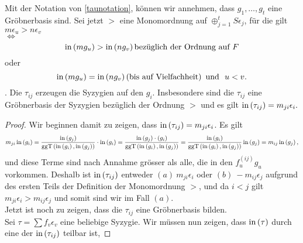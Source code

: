 \documentclass{article}
\begin{document}
	\begin{thm}[Schreyer \cite{Eis1}[15.10]
		Mit der Notation von \ref{taunotation}, 
		k\"onnen wir annehmen,
		dass
		\( g_1,\dots,g_t\)
		eine Gr\"obnerbasis sind.
		Sei jetzt 
		\( > \) 
		eine Monomordnung auf 
		\( \oplus_{j=1}^t S \epsilon_{j} \),
		f\"ur die gilt
		\( m \epsilon_{u} > n \epsilon_{v} \) \\
		\(\iff\)
		\[
			\operatorname{in}\left(  m g_{u} \right) > \operatorname{in}\left( n g_{v} \right) 
			\text{bez\"uglich der Ordnung auf } F 
		\]
		oder
		\[
			\operatorname{in}\left( m g_{u} \right) = \operatorname{in}\left( n g_{v} \right) 
			\left( \text{bis auf Vielfachheit} \right) \text{\ und \ } u < v.
		\].
		Die
		\( \tau_{ij} \) 
		erzeugen die Syzygien auf den
		\( g_{i} \).
		Insbesondere sind die
		\( \tau_{ij} \)
		eine Gr\"obnerbasis der Syzygien bez\"uglich der Ordnung
		\( > \)
		und es gilt
		\( \operatorname{in}\left( \tau_{ij} \right) = m_{ji}\epsilon_{i}.\)
		\begin{proof}
			Wir beginnen damit zu zeigen, dass
			\( \operatorname{in} \left( \tau_{ij} \right) 
			=
			m_{ji} \epsilon_{i} \).
			Es gilt 
			\[
				m_{ji} \operatorname{in} \left( g_{i} \right) 
				= \frac{
					\operatorname{in} \left(g_{j}\right) 
				}{
					\operatorname{ggT}\left( 
					\operatorname{in} \left( g_{i} \right),
					\operatorname{in} \left( g_{j} \right) 
					\right)
				}
				\cdot 
				\operatorname{in} \left( g_{i} \right) 
				= \frac{
					\operatorname{in} \left( g_{j}  \right)
					\cdot \left( g_{i} \right)
				}{
					\operatorname{ggT}\left( 
					\operatorname{in} \left( g_{i} \right),
					\operatorname{in} \left( g_{j} \right)
					\right)
				}
				=\frac{
					\operatorname{in} \left( g_{i} \right)
				}{
					\operatorname{ggT}\left( 
					\operatorname{in} \left( g_{i} \right),
					\operatorname{in} \left( g_{j} \right)
					\right)
				}
				\operatorname{in} \left( g_{j} \right)
				= m_{ij} \operatorname{in} \left( g_{j} \right),
			\]
			und diese Terme sind nach Annahme gr\"osser als alle,
			die in den 
			\( f_{u}^{\left( ij \right)} g_{u} \)
			vorkommen.
			Deshalb ist
			\( \operatorname{in}\left( \tau_{ij} \right) \)
			entweder
			\( (a) \ m_{ji} \epsilon_{i} \)
			oder
			\( (b) \ -m_{ij}\epsilon_{j} \)
			aufgrund des ersten Teils der Definition der Monomordnung
			\( > \),
			und da
			\( i < j \)
			gilt
			\( m_{ji} \epsilon_{i} 
			> m_{ij}\epsilon_{j} \)
			und somit sind wir im Fall 
			\( (a) \).\\
			Jetzt ist noch zu zeigen,
			dass die 
			\( \tau_{ij} \)
			eine Gr\"obnerbasis bilden.  \\
			Sei 
			\( \tau = \sum f_{v} \epsilon_{v}\)
			eine beliebige Syzygie.
			Wir m\"ussen nun zeigen,
			dass 
			\( \operatorname{in}\left( \tau \right) \)
			durch eine der 
			\( \operatorname{in}\left( \tau_{ij} \right)\)
			teilbar ist,

\end{proof}
\end{thm}
\end{document}
